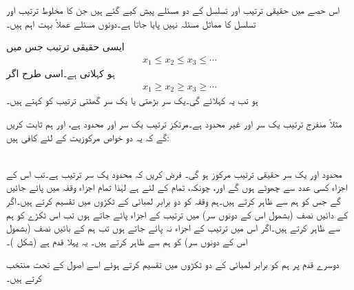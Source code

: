 اس حصے میں حقیقی ترتیب اور تسلسل کے دو مسئلے پیش کیے گئے ہیں جن کا مخلوط ترتیب اور تسلسل کا مماثل مسئلہ نہیں پایا جاتا ہے۔دونوں مسئلے عملاً بہت اہم ہیں۔

ایسی حقیقی ترتیب   جس میں
\begin{align*}
x_1\le x_2\le x_3\le\cdots
\end{align*} 
ہو  کہلاتی ہے۔اسی طرح  اگر
\begin{align*}
x_1\ge x_2\ge x_3\ge\cdots
\end{align*} 
ہو تب یہ  کہلائے گی۔یک سر بڑھتی یا یک سر گھٹتی ترتیب
 کو   کہتے ہیں۔

مثلاً منفرج ترتیب  یک سر اور غیر محدود ہے۔مرتکز ترتیب  یک سر اور محدود ہے، اور ہم ثابت کریں گے کہ یہ دو خواص مرکوزیت کے لئے کافی ہیں:

\quad {}\\
محدود اور یک سر حقیقی ترتیب مرکوز ہو گی۔
\quad
فرض کریں کہ  محدود یک سر ترتیب ہے۔تب اس کے اجزاء کسی عدد  سے چھوٹے ہوں گے اور، چونکہ، تمام  کے لئے  ہے لہٰذا تمام اجزاء  وقفہ  میں پائے جائیں گے جس کو ہم  سے ظاہر کرتے ہیں۔ہم  وقفہ  کو دو برابر لمبائی کے ٹکڑوں میں تقسیم کرتے ہیں۔اگر  کے دائیں نصف (بشمول اس کے دونوں سر) میں ترتیب کے اجزاء پائے جاتے ہوں تب اس ٹکڑے کو ہم  سے ظاہر کرتے ہیں۔اگر اس میں ترتیب کے اجزاء نہ پائے جاتے ہوں تب ہم  کے بائیں نصف (بشمول اس کے دونوں سر) کو ہم  سے ظاہر کرتے ہیں۔ یہ پہلا قدم ہے
 (شکل )۔

دوسرے قدم پر ہم  کو برابر لمبائی کے دو ٹکڑوں میں تقسیم کرتے ہوئے اسے اصول کے تحت  منتخب کرتے ہیں۔

